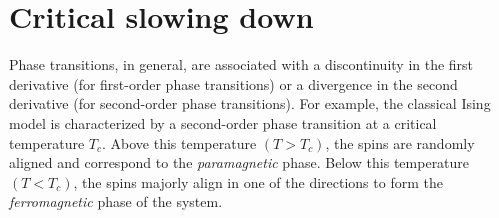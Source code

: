 \documentclass[../thesis_main.tex]{subfiles}
\begin{document}
\section{Critical slowing down}
Phase transitions, in general, are associated with a discontinuity in the first derivative (for first-order phase transitions) or a divergence in the second derivative (for second-order phase transitions). For example, the classical Ising model is characterized by a second-order phase transition at a critical temperature $T_c$. Above this temperature $(T>T_c)$, the spins are randomly aligned and correspond to the \textit{paramagnetic} phase. Below this temperature $(T<T_c)$, the spins majorly align in one of the directions to form the \textit{ferromagnetic} phase of the system.~\\~\\
\end{document}
